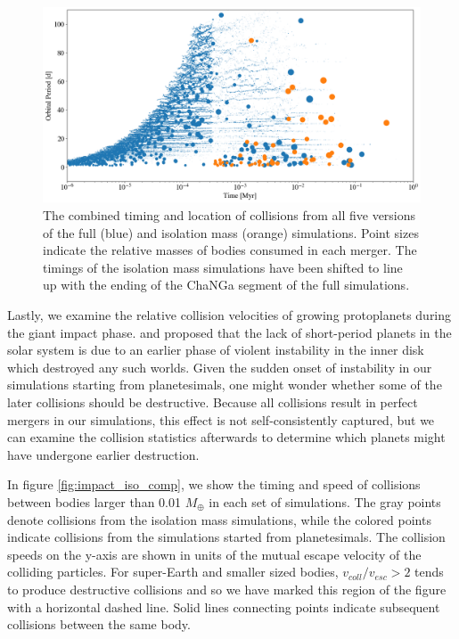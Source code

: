 
\begin{figure}
\begin{center}
    \includegraphics[width=\textwidth]{figures/stip/full_coll_iso_comp.png}
    \caption{The combined timing and location of collisions from all five versions of the full (blue) and isolation mass (orange) simulations. Point sizes indicate the relative masses of bodies consumed in each merger. The timings of the isolation mass simulations have been shifted to line up with the ending of the {\sc ChaNGa} segment of the full simulations.\label{fig:full_coll_iso_comp}}
\end{center}
\end{figure}

Lastly, we examine the relative collision velocities of growing protoplanets during the giant impact phase. \cite{volk15} and \cite{batygin15} proposed that the lack of short-period planets in the solar system is due to an earlier phase of violent instability in the inner disk which destroyed any such worlds. Given the sudden onset of instability in our simulations starting from planetesimals, one might wonder whether some of the later collisions should be destructive. Because all collisions result in perfect mergers in our simulations, this effect is not self-consistently captured, but we can examine the collision statistics afterwards to determine which planets might have undergone earlier destruction.

In figure \ref{fig:impact_iso_comp}, we show the timing and speed of collisions between bodies larger than 0.01 $M_{\oplus}$ in each set of simulations. The gray points denote collisions from the isolation mass simulations, while the colored points indicate collisions from the simulations started from planetesimals. The collision speeds on the y-axis are shown in units of the mutual escape velocity of the colliding particles. For super-Earth and smaller sized bodies, $v_{coll}/v_{esc} > 2$ tends to produce destructive collisions \cite{marcus09} and so we have marked this region of the figure with a horizontal dashed line. Solid lines connecting points indicate subsequent collisions between the same body.

